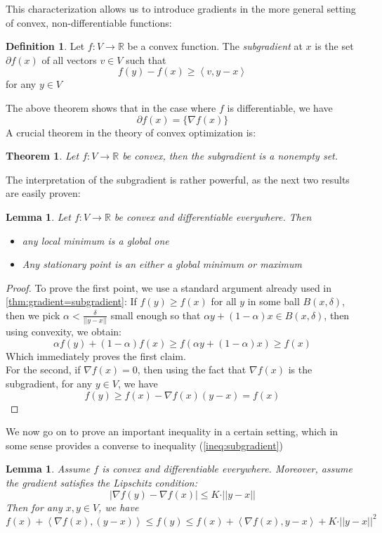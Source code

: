 \documentclass{book}
\theoremstyle{plain}
\newtheorem{theorem}[corollary]{Theorem}
\newtheorem{lemma}[corollary]{Lemma}
\theoremstyle{definition}
\newtheorem{definition}[corollary]{Definition}
\newcommand{\bl}[2]{\left\langle #1,#2\right\rangle}
\renewcommand{\d}[1]{\mathbb{#1}}
\newcommand{\norm}[1]{\vert \vert #1 \vert \vert}
\newcommand{\mor}{\longrightarrow}
\begin{document}
\noindent This characterization allows us to introduce gradients in the more general setting of convex, non-differentiable functions:
\begin{definition}
Let $f:V\mor \d{R}$ be a convex function. The \emph{subgradient} at $x$ is the set $\partial f(x)$ of all vectors $v \in V$ such that 
\[
f(y)-f(x)\ge \bl{v}{ y-x}
\]	
for any $y \in V$
\end{definition}

\noindent The above theorem shows that in the case where $f$ is differentiable, we have
\[
\partial f(x)=\{\nabla f(x)\}
\]
A crucial theorem in the theory of convex optimization is:
\begin{theorem}
Let $f:V \mor \d{R}$ be convex, then the subgradient is a nonempty set.	
\end{theorem}

\noindent The interpretation of the subgradient is rather powerful, as the next two results are easily proven:
\begin{lemma}\label{lem:stationary_point=global_minimum}
Let $f:V\mor \d{R}$ be convex and differentiable everywhere. Then
\begin{itemize}
\item any local minimum is a global one
\item Any stationary point is an either a global minimum or maximum	
\end{itemize}
\end{lemma}

\begin{proof}
To prove the first point, we use a standard argument already used in \ref{thm:gradient=subgradient}:
If $f(y)\ge f(x)$ for all $y$ in some ball $B(x,\delta)$, then we pick $\alpha<\frac{\delta}{\vert \vert y-x \vert\vert }$ small enough so that $\alpha y+(1-\alpha)x \in B(x,\delta)$, then using convexity, we obtain:
\[
\alpha f(y)+(1-\alpha)f(x)\ge f(\alpha y+(1-\alpha)x)\ge f(x)
\]
Which immediately proves the first claim.\\
\noindent For the second, if $\nabla f(x)=0$, then using the fact that $\nabla f(x)$ is the subgradient, for any $y \in V$, we have
\[
f(y)\ge f(x)-\nabla f(x)(y-x)=f(x)
\]
\end{proof}

We now  go on to prove an important inequality in a certain setting, which in some sense provides a converse to inequality (\ref{ineq:subgradient})

\begin{lemma}
Assume $f$ is convex and differentiable everywhere. Moreover, assume the gradient satisfies the Lipschitz condition:
\[
\vert  \nabla f(y)-\nabla f(x) \vert \le K\cdot \norm{y-x}
\]	
Then for any $x,y \in V$, we have
\[
f(x)+\bl{\nabla f(x)}{(y-x)} \le f(y)\le f(x)+\bl{\nabla f(x)}{y-x} + K \cdot \norm{y-x}^2
\]
\end{lemma}
\end{document}
